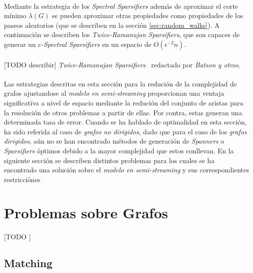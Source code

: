 \documentclass{subfiles}
\begin{document}
        \paragraph{}
        Mediante la estrategia de los \emph{Spectral Sparsifiers} además de aproximar el corte mínimo $\lambda(G)$ se pueden aproximar otras propiedades como propiedades de los paseos aleatorios (que se describen en la sección \ref{sec:random_walks}). A continuación se describen los \emph{Twice-Ramanujan Sparsifiers}, que son capaces de generar un \emph{$e$-Spectral Sparsifiers} en un espacio de $O(\epsilon^{-2}n)$.

        \paragraph{}
        [TODO describir] \emph{Twice-Ramanujan Sparsifiers} \cite{batson2012twice} redactado por \emph{Batson y otros}.

        \paragraph{}
        Las estrategias descritas en esta sección para la redución de la complejidad de grafos ajustandose al \emph{modelo en semi-streaming} proporcionan una ventaja significativa a nivel de espacio mediante la redución del conjunto de aristas para la resolución de otros problemas a partir de ellas. Por contra, estas generan una determinada tasa de error. Cuando se ha hablado de optimalidad en esta sección, ha sido referida al caso de \emph{grafos no dirigidos}, dado que para el caso de los \emph{grafos dirigidos}, aún no se han encontrado métodos de generación de \emph{Spanners} o \emph{Sparsifiers} óptimos debido a la mayor complejidad que estos conllevan. En la siguiente sección se describen distintos problemas para los cuales se ha encontrado una solución sobre el \emph{modelo en semi-streaming} y sus correspondientes restricciónes


    \section{Problemas sobre Grafos}
    \label{sec:graph_problems}

      \paragraph{}
      [TODO ]

      \subsection{Matching}
      \label{sec:graph_matchings}
\end{document}

